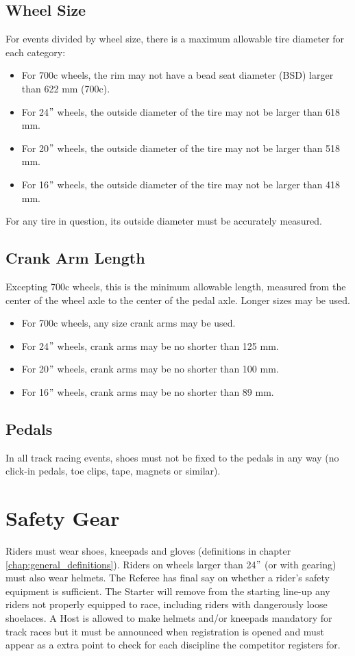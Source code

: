 \subsection{Wheel Size}
For events divided by wheel size, there is a maximum allowable tire diameter for each category: 
\begin{itemize}
\item For 700c wheels, the rim may not have a bead seat diameter (BSD) larger than 622 mm (700c).
\item For 24$"$ wheels, the outside diameter of the tire may not be larger than 618 mm.
\item For 20$"$ wheels, the outside diameter of the tire may not be larger than 518 mm.
\item For 16$"$ wheels, the outside diameter of the tire may not be larger than 418 mm.
\end{itemize}
For any tire in question, its outside diameter must be accurately measured.

\subsection{Crank Arm Length}
Excepting 700c wheels, this is the minimum allowable length, measured from the center of the wheel axle to the center of the pedal axle.
Longer sizes may be used.
\begin{itemize}
\item For 700c wheels, any size crank arms may be used.
\item For 24$"$ wheels, crank arms may be no shorter than 125 mm.
\item For 20$"$ wheels, crank arms may be no shorter than 100 mm.
\item For 16$"$ wheels, crank arms may be no shorter than 89 mm.
\end{itemize}

\subsection{Pedals}
In all track racing events, shoes must not be fixed to the pedals in any way (no click-in pedals, toe clips, tape, magnets or similar).

\section{Safety Gear}
Riders must wear shoes, kneepads and gloves (definitions in chapter \ref{chap:general_definitions}).
Riders on wheels larger than 24$"$ (or with gearing) must also wear helmets.
The Referee has final say on whether a rider's safety equipment is sufficient.
The Starter will remove from the starting line-up any riders not properly equipped to race, including riders with dangerously loose shoelaces.
A Host is allowed to make helmets and/or kneepads mandatory for track races but it must be announced when registration is opened and must appear as a extra point to check for each discipline the competitor registers for.

